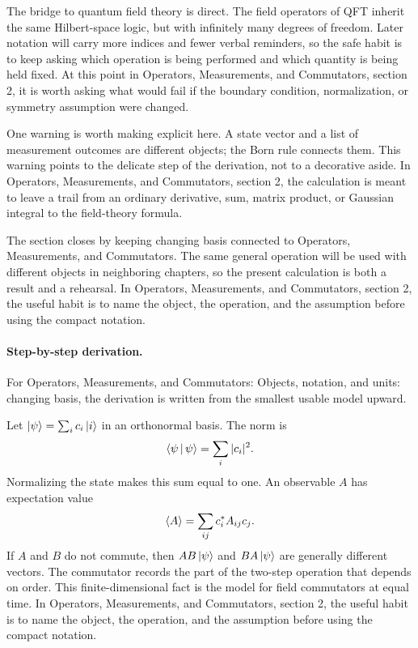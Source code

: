 The bridge to quantum field theory is direct.  The field operators of QFT inherit the same Hilbert-space logic, but with infinitely many degrees of freedom.  Later notation will carry more indices and fewer verbal reminders, so the safe habit is to keep asking which operation is being performed and which quantity is being held fixed.  At this point in Operators, Measurements, and Commutators, section 2, it is worth asking what would fail if the boundary condition, normalization, or symmetry assumption were changed.

One warning is worth making explicit here.  A state vector and a list of measurement outcomes are different objects; the Born rule connects them.  This warning points to the delicate step of the derivation, not to a decorative aside.  In Operators, Measurements, and Commutators, section 2, the calculation is meant to leave a trail from an ordinary derivative, sum, matrix product, or Gaussian integral to the field-theory formula.

The section closes by keeping changing basis connected to Operators, Measurements, and Commutators.  The same general operation will be used with different objects in neighboring chapters, so the present calculation is both a result and a rehearsal.  In Operators, Measurements, and Commutators, section 2, the useful habit is to name the object, the operation, and the assumption before using the compact notation.



\paragraph{Step-by-step derivation.}

For Operators, Measurements, and Commutators: Objects, notation, and units: changing basis, the derivation is written from the smallest usable model upward.

Let \(\left|\psi\right\rangle=\sum_i c_i\left|i\right\rangle\) in an orthonormal basis.  The norm is
\[
  \left\langle \psi\,\middle|\,\psi\right\rangle=\sum_i |c_i|^2.
\]
Normalizing the state makes this sum equal to one.  An observable \(A\) has expectation value
\[
  \left\langle A\right\rangle=\sum_{ij}c_i^*A_{ij}c_j.
\]
If \(A\) and \(B\) do not commute, then \(AB\left|\psi\right\rangle\) and \(BA\left|\psi\right\rangle\) are generally different vectors.  The commutator records the part of the two-step operation that depends on order.  This finite-dimensional fact is the model for field commutators at equal time.  In Operators, Measurements, and Commutators, section 2, the useful habit is to name the object, the operation, and the assumption before using the compact notation.

